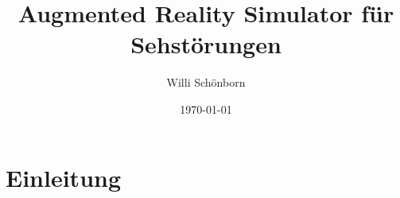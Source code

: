 \documentclass[a4paper]{article}
\title{Augmented Reality Simulator für Sehstörungen}
\author{Willi Schönborn}
\date{\today}
\begin{document}
\maketitle

\section*{Einleitung}

\printbibliography

\listoffigures
\end{document}
